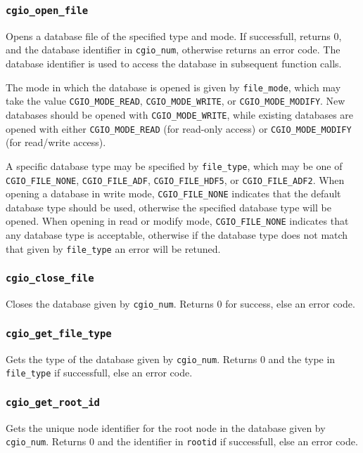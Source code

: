 \subsubsection{\texttt{cgio\_open\_file}} \label{open_file}
    \noindent
    Opens a database file of the specified type and mode. If successfull,
    returns 0, and the database identifier in \texttt{cgio\_num}, otherwise
    returns an error code. The database identifier is used to access the
    database in subsequent function calls.

    \noindent
    The mode in which the database is opened is given by \texttt{file\_mode},
    which may take the value \texttt{CGIO\_MODE\_READ}, \texttt{CGIO\_MODE\_WRITE},
    or \texttt{CGIO\_MODE\_MODIFY}. New databases should be opened with
    \texttt{CGIO\_MODE\_WRITE}, while existing databases are opened with either
    \texttt{CGIO\_MODE\_READ} (for read-only access) or
    \texttt{CGIO\_MODE\_MODIFY} (for read/write access).
 
    \noindent
    A specific database type may be specified by \texttt{file\_type}, which may
    be one of \texttt{CGIO\_FILE\_NONE}, \texttt{CGIO\_FILE\_ADF},
    \texttt{CGIO\_FILE\_HDF5}, or \texttt{CGIO\_FILE\_ADF2}. When opening a database
    in write mode, \texttt{CGIO\_FILE\_NONE} indicates that the default database
    type should be used, otherwise the specified database type will be opened.
    When opening in read or modify mode, \texttt{CGIO\_FILE\_NONE} indicates that
    any database type is acceptable, otherwise if the database type does
    not match that given by \texttt{file\_type} an error will be retuned.

\subsubsection{\texttt{cgio\_close\_file}} \label{close_file}
    \noindent
    Closes the database given by \texttt{cgio\_num}. Returns 0 for success,
    else an error code.

\subsubsection{\texttt{cgio\_get\_file\_type}} \label{get_file_type}
    \noindent
    Gets the type of the database given by \texttt{cgio\_num}.
    Returns 0 and the type in \texttt{file\_type} if successfull,
    else an error code.

\subsubsection{\texttt{cgio\_get\_root\_id}} \label{get_root_id}
    \noindent
    Gets the unique node identifier for the root node in the database given
    by \texttt{cgio\_num}. Returns 0 and the identifier in \texttt{rootid}
    if successfull, else an error code.


